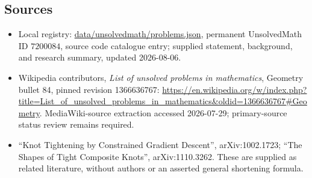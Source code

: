 \documentclass[11pt]{article}
\begin{document}
\subsection{Sources}
\begin{itemize}
\item Local registry: \url{data/unsolvedmath/problems.json}, permanent UnsolvedMath ID \(7200084\), source code catalogue entry; supplied statement, background, and research summary, updated 2026-08-06.
\item Wikipedia contributors, \emph{List of unsolved problems in mathematics}, Geometry bullet 84, pinned revision 1366636767: \url{https://en.wikipedia.org/w/index.php?title=List_of_unsolved_problems_in_mathematics&oldid=1366636767#Geometry}. MediaWiki-source extraction accessed 2026-07-29; primary-source status review remains required.
\item ``Knot Tightening by Constrained Gradient Descent'', arXiv:1002.1723; ``The Shapes of Tight Composite Knots'', arXiv:1110.3262. These are supplied as related literature, without authors or an asserted general shortening formula.
\end{itemize}
\end{document}

